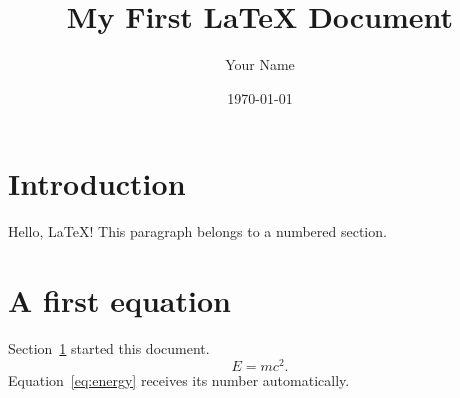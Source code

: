 \documentclass{article}
\title{My First LaTeX Document}
\author{Your Name}
\date{\today}
\begin{document}
\maketitle
\section{Introduction}
\label{sec:introduction}
Hello, LaTeX! This paragraph belongs to a numbered section.

\section{A first equation}
Section~\ref{sec:introduction} started this document.
\begin{equation}
  E=mc^2.
  \label{eq:energy}
\end{equation}
Equation~\ref{eq:energy} receives its number automatically.
\end{document}
